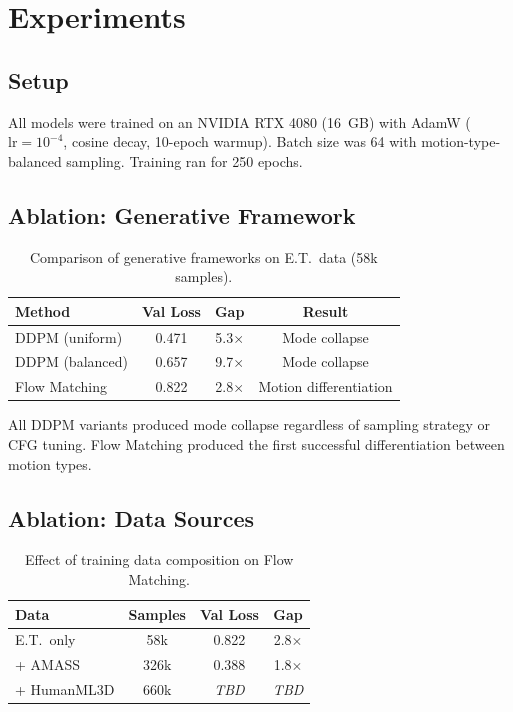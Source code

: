 \documentclass[10pt,twocolumn,letterpaper]{article}
\begin{document}
\section{Experiments}

\subsection{Setup}

All models were trained on an NVIDIA RTX 4080 (16~GB) with AdamW ($\text{lr} = 10^{-4}$, cosine decay, 10-epoch warmup). Batch size was 64 with motion-type-balanced sampling. Training ran for 250 epochs.

\subsection{Ablation: Generative Framework}

\begin{table}[t]
\centering
\caption{Comparison of generative frameworks on E.T.\ data (58k samples).}
\label{tab:framework}
\begin{tabular}{@{}lccc@{}}
\toprule
Method & Val Loss & Gap & Result \\
\midrule
DDPM (uniform) & 0.471 & 5.3$\times$ & Mode collapse \\
DDPM (balanced) & 0.657 & 9.7$\times$ & Mode collapse \\
Flow Matching & 0.822 & 2.8$\times$ & Motion differentiation \\
\bottomrule
\end{tabular}
\end{table}

All DDPM variants produced mode collapse regardless of sampling strategy or CFG tuning. Flow Matching produced the first successful differentiation between motion types.

\subsection{Ablation: Data Sources}

\begin{table}[t]
\centering
\caption{Effect of training data composition on Flow Matching.}
\label{tab:data_ablation}
\begin{tabular}{@{}lccc@{}}
\toprule
Data & Samples & Val Loss & Gap \\
\midrule
E.T.\ only & 58k & 0.822 & 2.8$\times$ \\
+ AMASS & 326k & 0.388 & 1.8$\times$ \\
+ HumanML3D & 660k & \textit{TBD} & \textit{TBD} \\
\bottomrule
\end{tabular}
\end{table}
\end{document}

